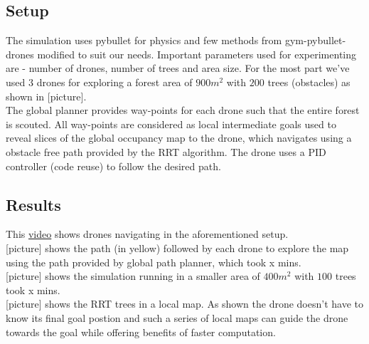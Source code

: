 \subsection{Setup}

The simulation uses pybullet for physics and few methods from gym-pybullet-drones modified to suit our needs. Important parameters used for experimenting are - number of drones, number of trees and area size. For the most part we've used $3$ drones for exploring a forest area of $900m^2$ with $200$ trees (obstacles) as shown in [picture]. \\

The global planner provides way-points for each drone such that the entire forest is scouted. All way-points are considered as local intermediate goals used to reveal slices of the global occupancy map to the drone, which navigates using a obstacle free path provided by the RRT algorithm. The drone uses a PID controller (code reuse) to follow the desired path.\\

\subsection{Results}

This \href{https://www.youtube.com/watch?v=JBWNEh0Fis4&ab_channel=ShantnavAgarwal}{video} shows drones navigating in the aforementioned setup.\\

[picture] shows the path (in yellow) followed by each drone to explore the map using the path provided by global path planner, which took x mins. \\

[picture] shows the simulation running in a smaller area of $400m^2$ with $100$ trees took x mins. \\

[picture] shows the RRT trees in a local map. As shown the drone doesn't have to know its final goal postion and such a series of local maps can guide the drone towards the goal while offering benefits of faster computation.
